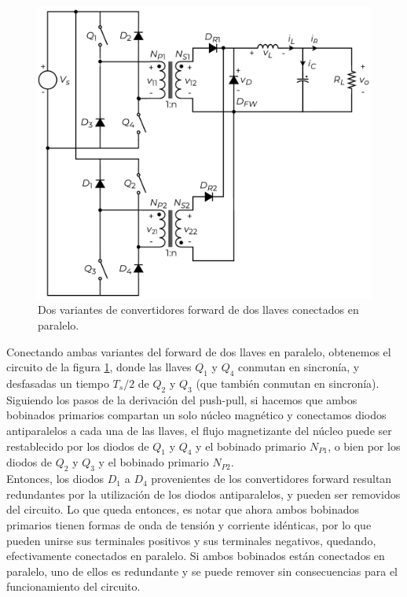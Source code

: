 \begin{figure}[h]
    \centering
    \includegraphics[scale=0.6]{Imagenes/Desarrollo Full-Bridge.pdf}
    \caption{Dos variantes de convertidores forward de dos llaves conectados en paralelo.}
    \label{desarrollo_fullbridge}
\end{figure}

Conectando ambas variantes del forward de dos llaves en paralelo, obtenemos el circuito de la figura \ref{desarrollo_fullbridge}, donde las llaves $Q_1$ y $Q_4$ conmutan en sincronía, y desfasadas un tiempo $T_s/2$ de $Q_2$ y $Q_3$ (que también conmutan en sincronía).\\

Siguiendo los pasos de la derivación del push-pull, si hacemos que ambos bobinados primarios compartan un solo núcleo magnético y conectamos diodos antiparalelos a cada una de las llaves, el flujo magnetizante del núcleo puede ser restablecido por los diodos de $Q_1$ y $Q_4$ y el bobinado primario $N_{P1}$, o bien por los diodos de $Q_2$ y $Q_3$ y el bobinado primario $N_{P2}$.\\

Entonces, los diodos $D_1$ a $D_4$ provenientes de los convertidores forward resultan redundantes por la utilización de los diodos antiparalelos, y pueden ser removidos del circuito. Lo que queda entonces, es notar que ahora ambos bobinados primarios tienen formas de onda de tensión y corriente idénticas, por lo que pueden unirse sus terminales positivos y sus terminales negativos, quedando, efectivamente conectados en paralelo. Si ambos bobinados están conectados en paralelo, uno de ellos es redundante y se puede remover sin consecuencias para el funcionamiento del circuito.\\

